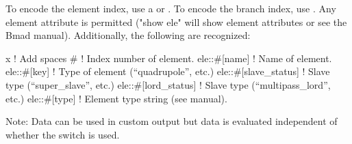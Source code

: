 {{{{{{{{\begin{description}
To encode the element index, use a \vn{\#} or . To encode the branch index, use
. Any element attribute is permitted ("show ele" will show element attributes or see
the Bmad manual). Additionally, the following are recognized:
\begin{example}
  x                           ! Add spaces
  #                           ! Index number of element.
  ele::#[name]                ! Name of element.
  ele::#[key]                 ! Type of element (``quadrupole'', etc.)
  ele::#[slave_status]        ! Slave type (``super_slave'', etc.)
  ele::#[lord_status]         ! Slave type (``multipass_lord'', etc.)
  ele::#[type]                ! Element type string (see \bmad manual).
\end{example}

Note: Data can be used in custom output but data is evaluated independent of whether the
 switch is used.


\end{description}}}}}}}}}

